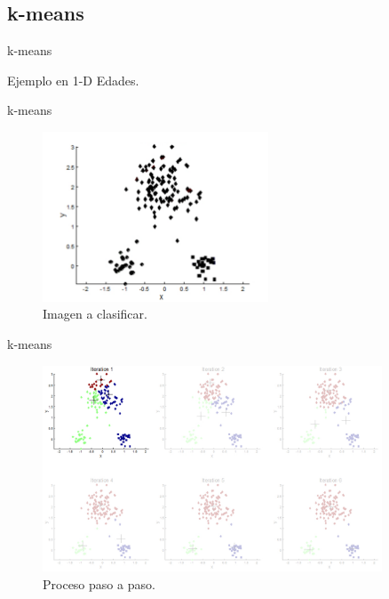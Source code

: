 \documentclass[handout]{beamer}
\begin{document}
\subsection{k-means}
\begin{frame}{k-means}
  \begin{exampleblock}{Ejemplo en 1-D}
    Edades.
  \end{exampleblock}
\end{frame}

\begin{frame}{k-means}
  \begin{figure}
    \includegraphics[width=0.6\textwidth]{imagenes/byn.png}
    \caption{Imagen a clasificar.}
  \end{figure}
\end{frame}

\begin{frame}{k-means}
  \begin{figure}
    \includegraphics[width=0.9\textwidth]{imagenes/step1.png}
    \caption{Proceso paso a paso.}
  \end{figure}
\end{frame}
\end{document}
